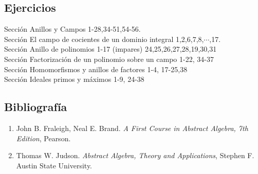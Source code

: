 
\usepackage{nopageno}  


\begin{multicols}{2}
	\section*{Ejercicios}
	\noindent
	Sección   Anillos y Campos 1-28,34-51,54-56. \\
	Sección   El campo de cocientes de un dominio integral 1,2,6,7,8,$\cdots$,17. \\
	Sección  Anillo de polinomios 1-17 (impares) 24,25,26,27,28,19,30,31 \\
	Sección  Factorización de un polinomio sobre un campo  1-22, 34-37 \\
	Sección  Homomorfismos y anillos de factores 1-4, 17-25,38 \\ 
	Sección  Ideales primos y máximos 1-9, 24-38 \\
	
	
	
	
\end{multicols}

\subsection*{Bibliografía}

\begin{enumerate}
	\item 	John B. Fraleigh, Neal E. Brand. \textit{A First Course in Abstract Algebra, 7th Edition},  Pearson.
	\item 	Thomas W. Judson. \textit{Abstract Algebra, Theory and Applications}, Stephen F. Austin State University.
\end{enumerate}



